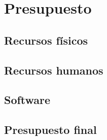
\chapter{Presupuesto} \label{cap:presupuesto}

\section{Recursos físicos}

\section{Recursos humanos}

\section{Software}

\section{Presupuesto final}

